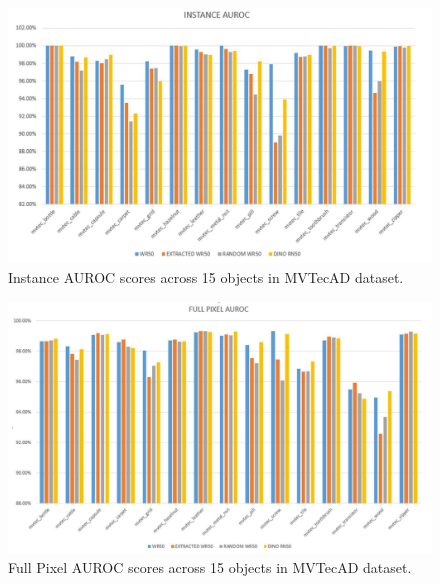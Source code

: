\begin{figure}[t]
	\begin{center}
		\includegraphics[width=1.0\linewidth]{Chapter_4/wd_instance.png}
	\end{center}
	\caption{Instance AUROC scores across 15 objects in MVTecAD dataset.}
	\label{fig:wd_instance}
\end{figure}

\begin{figure}[t]
	\begin{center}
		\includegraphics[width=1.0\linewidth]{Chapter_4/wd_full_pixel.png}
	\end{center}
	\caption{Full Pixel AUROC scores across 15 objects in MVTecAD dataset.}
	\label{fig:wd_full_pixel}
\end{figure}

